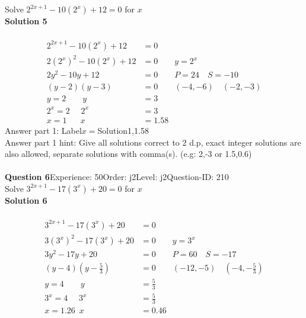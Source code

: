 \documentclass{article}
\begin{document}
Solve $2^{2x+1}-10(2^x)+12=0$ for $x$\\[4pt]
\noindent\textbf{Solution 5}\\[2pt]
\\[-35pt]\begin{align*}
2^{2x+1}-10(2^x)+12&=0\\[2pt]
2(2^x)^2-10(2^x)+12&=0\qquad y=2^x\\[2pt]
2y^2-10y+12&=0\qquad P=24 \quad S=-10\\[2pt]
(y-2)(y-3)&=0\qquad (-4,-6)\quad (-2,-3)\\[2pt]
y=2 \qquad y&=3\\[2pt]
2^x=2\hspace{16pt} 2^x&=3\\[2pt]
x=1 \hspace{20pt} x&=1.58
\end{align*}
Answer part 1: \hspace{10pt}Label\hspace{10pt}$x=$\hspace{10pt}Solution\hspace{10pt}1,1.58\\
Answer part 1 hint: \hspace{15pt} Give all solutions correct to 2 d.p, exact integer solutions are also allowed, separate solutions with comma(s). (e.g: 2,-3 or 1.5,0.6)\\
\\[4pt]
\noindent\textbf{Question 6}\hspace{20pt}Experience: 50\hspace{20pt}Order: j2\hspace{20pt}Level: j2\hspace{20pt}Question-ID: 210\\[2pt]
Solve $3^{2x+1}-17(3^x)+20=0$ for $x$\\[4pt]
\noindent\textbf{Solution 6}\\[2pt]
\\[-35pt]\begin{align*}
3^{2x+1}-17(3^x)+20&=0\\[2pt]
3(3^x)^2-17(3^x)+20&=0\qquad y=3^x\\[2pt]
3y^2-17y+20&=0\qquad P=60 \quad S=-17\\[2pt]
(y-4)\left(y-\displaystyle\frac{5}{3}\right)&=0\qquad (-12,-5)\quad \left(-4,-\displaystyle\frac{5}{3}\right)\\[2pt]
y=4 \qquad y&=\displaystyle\frac{5}{3}\\[2pt]
3^x=4\hspace{16pt} 3^x&=\displaystyle\frac{5}{3}\\[2pt]
x=1.26 \hspace{6pt} x&=0.46
\end{align*}
\end{document}
